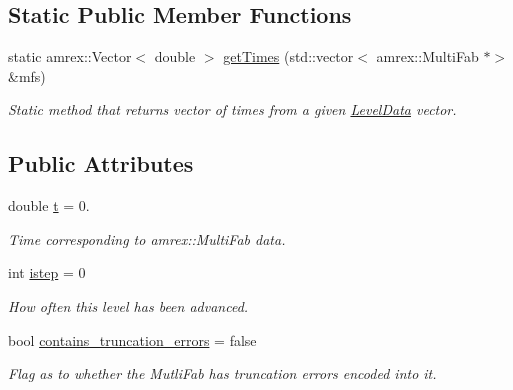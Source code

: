 \subsection*{Static Public Member Functions}
\begin{DoxyCompactItemize}
\item 
static amrex\+::\+Vector$<$ double $>$ \mbox{\hyperlink{classsledgehamr_1_1LevelData_a852bf27c741978378a87ce043cce3b24}{get\+Times}} (std\+::vector$<$ amrex\+::\+Multi\+Fab $\ast$$>$ \&mfs)
\begin{DoxyCompactList}\small\item\em Static method that returns vector of times from a given \mbox{\hyperlink{classsledgehamr_1_1LevelData}{Level\+Data}} vector. \end{DoxyCompactList}\end{DoxyCompactItemize}
\subsection*{Public Attributes}
\begin{DoxyCompactItemize}
\item 
\mbox{\label{classsledgehamr_1_1LevelData_a9bc416cbd6054f0adb499ffd64144860}} 
double \mbox{\hyperlink{classsledgehamr_1_1LevelData_a9bc416cbd6054f0adb499ffd64144860}{t}} = 0.
\begin{DoxyCompactList}\small\item\em Time corresponding to amrex\+::\+Multi\+Fab data. \end{DoxyCompactList}\item 
\mbox{\label{classsledgehamr_1_1LevelData_a1fc20b81bee0349d0cc24a8407a42e3a}} 
int \mbox{\hyperlink{classsledgehamr_1_1LevelData_a1fc20b81bee0349d0cc24a8407a42e3a}{istep}} = 0
\begin{DoxyCompactList}\small\item\em How often this level has been advanced. \end{DoxyCompactList}\item 
\mbox{\label{classsledgehamr_1_1LevelData_af4bc919d70ab9353c53c8e70e795777d}} 
bool \mbox{\hyperlink{classsledgehamr_1_1LevelData_af4bc919d70ab9353c53c8e70e795777d}{contains\+\_\+truncation\+\_\+errors}} = false
\begin{DoxyCompactList}\small\item\em Flag as to whether the Mutli\+Fab has truncation errors encoded into it. \end{DoxyCompactList}\end{DoxyCompactItemize}


